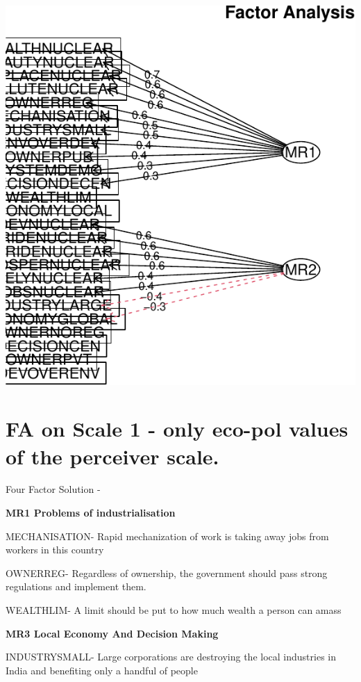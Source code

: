 \documentclass[
]{article}
\begin{document}
\includegraphics{module2PCAs_files/figure-latex/unnamed-chunk-8-1.pdf}

\newpage

\hypertarget{fa-on-scale-1---only-eco-pol-values-of-the-perceiver-scale.}{%
\section{FA on Scale 1 - only eco-pol values of the perceiver
scale.}\label{fa-on-scale-1---only-eco-pol-values-of-the-perceiver-scale.}}

Four Factor Solution -

\textbf{MR1 Problems of industrialisation}

MECHANISATION- Rapid mechanization of work is taking away jobs from
workers in this country

OWNERREG- Regardless of ownership, the government should pass strong
regulations and implement them.

WEALTHLIM- A limit should be put to how much wealth a person can amass

\textbf{MR3 Local Economy And Decision Making}

INDUSTRYSMALL- Large corporations are destroying the local industries in
India and benefiting only a handful of people
\end{document}
